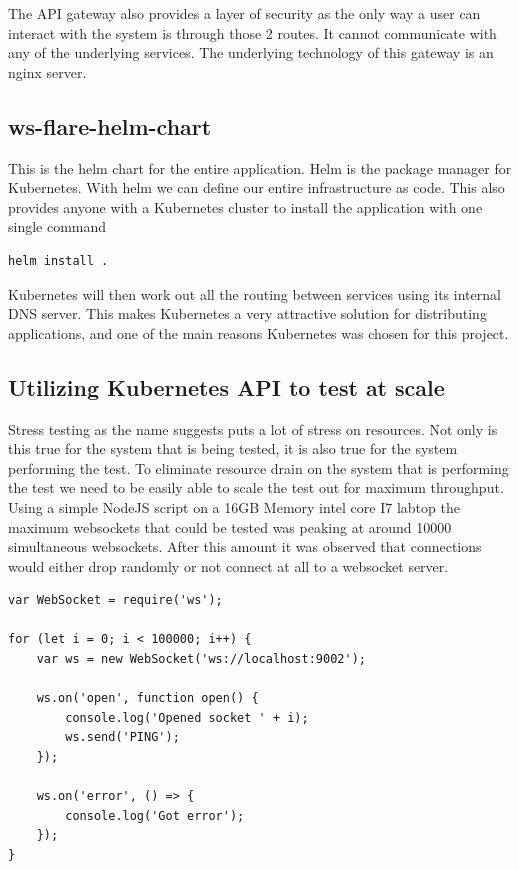 The API gateway also provides a layer of security as the only way a user can interact with the system is through those 2 routes. It cannot communicate with any of the underlying services. The underlying technology of this gateway is an nginx server.

\subsection{ws-flare-helm-chart}

This is the helm chart for the entire application. Helm is the package manager for Kubernetes. With helm we can define our entire infrastructure as code. This also provides anyone with a Kubernetes cluster to install the application with one single command

\begin{verbatim}
helm install .
\end{verbatim}

Kubernetes will then work out all the routing between services using its internal DNS server. This makes Kubernetes a very attractive solution for distributing applications, and one of the main reasons Kubernetes was chosen for this project.

\subsection{Utilizing Kubernetes API to test at scale}

Stress testing as the name suggests puts a lot of stress on resources. Not only is this true for the system that is being tested, it is also true for the system performing the test. To eliminate resource drain on the system that is performing the test we need to be easily able to scale the test out for maximum throughput. Using a simple NodeJS script on a 16GB Memory intel core I7 labtop the maximum websockets that could be tested was peaking at around 10000 simultaneous websockets. After this amount it was observed that connections would either drop randomly or not connect at all to a websocket server. 

\begin{verbatim}
var WebSocket = require('ws');

for (let i = 0; i < 100000; i++) {
    var ws = new WebSocket('ws://localhost:9002');

    ws.on('open', function open() {
        console.log('Opened socket ' + i);
        ws.send('PING');
    });

    ws.on('error', () => {
        console.log('Got error');
    });
}
\end{verbatim}

